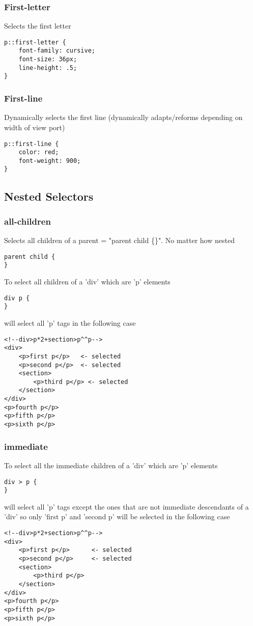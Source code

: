 \documentclass[]{article}
\begin{document}
\subsubsection{First-letter}
Selects the first letter
\begin{lstlisting}
p::first-letter {
	font-family: cursive;
	font-size: 36px;
	line-height: .5;
}
\end{lstlisting}

\subsubsection{First-line}
Dynamically selects the first line (dynamically adapts/reforms depending on width of view port)
\begin{lstlisting}
p::first-line {
	color: red;
	font-weight: 900;
}
\end{lstlisting}

\subsection{Nested Selectors}
\subsubsection{all-children}
Selects all children of a parent = "parent child \{\}".  No matter how nested 
\begin{lstlisting}
parent child {
}
\end{lstlisting}
To select all children of a 'div' which are 'p' elements 
\begin{lstlisting}
div p {
}
\end{lstlisting}
will select all 'p' tags in the following case
\begin{lstlisting}
<!--div>p*2+section>p^^p-->
<div>
	<p>first p</p>   <- selected 
	<p>second p</p>  <- selected 
	<section>
		<p>third p</p> <- selected 
	</section>
</div>
<p>fourth p</p>
<p>fifth p</p>
<p>sixth p</p>
\end{lstlisting}

\subsubsection{immediate}
To select all the immediate children of a 'div' which are 'p' elements 
\begin{lstlisting}
div > p {
}
\end{lstlisting}
will select all 'p' tags except the ones that are not immediate descendants of a 'div' so only 'first p' and 'second p' will be selected in the following case
\begin{lstlisting}
<!--div>p*2+section>p^^p-->
<div>
	<p>first p</p>      <- selected 
	<p>second p</p>     <- selected
	<section>
		<p>third p</p>
	</section>
</div>
<p>fourth p</p>
<p>fifth p</p>
<p>sixth p</p>
\end{lstlisting}
\end{document}
